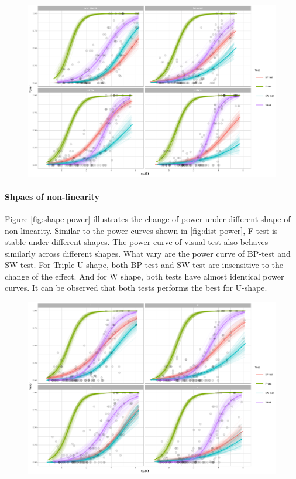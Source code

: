 \documentclass[]{interact}
\theoremstyle{plain}%
\theoremstyle{definition}
\theoremstyle{remark}
\begin{document}
\begin{figure}
\centering
\includegraphics{paper_comparison_files/figure-latex/dist-power-1.pdf}
\caption{\label{dist-power}}
\end{figure}

\hypertarget{shpaes-of-non-linearity}{%
\paragraph{Shpaes of non-linearity}\label{shpaes-of-non-linearity}}

Figure \ref{fig:shape-power} illustrates the change of power under
different shape of non-linearity. Similar to the power curves shown in
\ref{fig:dist-power}, F-test is stable under different shapes. The power
curve of visual test also behaves similarly across different shapes.
What vary are the power curve of BP-test and SW-test. For Triple-U
shape, both BP-test and SW-test are insensitive to the change of the
effect. And for W shape, both tests have almost identical power curves.
It can be observed that both tests performs the best for U-shape.

\begin{figure}
\centering
\includegraphics{paper_comparison_files/figure-latex/shape-power-1.pdf}
\caption{\label{shape-power}}
\end{figure}
\end{document}
